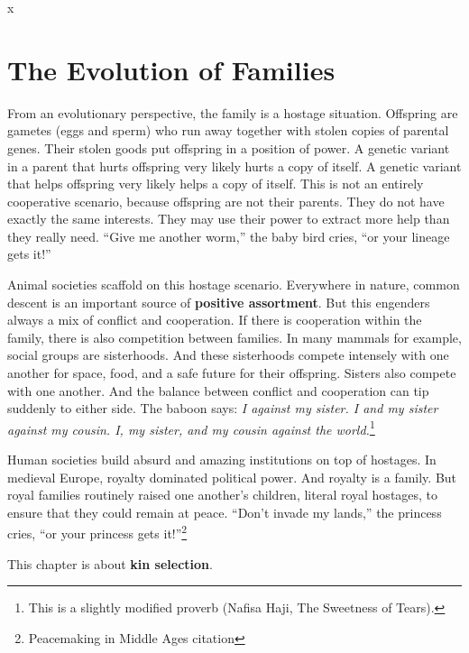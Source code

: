 \documentclass[10pt,reqno]{amsbook}
\newcommand{\bemph}[1]{{\textbf{\textcolor{bemphcol}{#1}}}}
\numberwithin{equation}{chapter}
\begin{document}
x

\def \chapterElement {K}
\chapter{The Evolution of Families}


From an evolutionary perspective, the family is a hostage situation. Offspring are gametes (eggs and sperm) who run away together with stolen copies of parental genes. Their stolen goods put offspring in a position of power. A genetic variant in a parent that hurts offspring very likely hurts a copy of itself. A genetic variant that helps offspring very likely helps a copy of itself. This is not an entirely cooperative scenario, because offspring are not their parents. They do not have exactly the same interests. They may use their power to extract more help than they really need. ``Give me another worm,'' the baby bird cries, ``or your lineage gets it!''

Animal societies scaffold on this hostage scenario. Everywhere in nature, common descent is an important source of \bemph{positive assortment}. But this engenders always a mix of conflict and cooperation. If there is cooperation within the family, there is also competition between families. In many mammals for example, social groups are sisterhoods. And these sisterhoods compete intensely with one another for space, food, and a safe future for their offspring. Sisters also compete with one another. And the balance between conflict and cooperation can tip suddenly to either side. The baboon says: \emph{I against my sister. I and my sister against my cousin. I, my sister, and my cousin against the world.}\footnote{This is a slightly modified proverb (Nafisa Haji, The Sweetness of Tears).}

Human societies build absurd and amazing institutions on top of hostages. In medieval Europe, royalty dominated political power. And royalty is a family. But royal families routinely raised one another's children, literal royal hostages, to ensure that they could remain at peace. ``Don't invade my lands,'' the princess cries, ``or your princess gets it!''\footnote{Peacemaking in Middle Ages citation}  %

This chapter is about \bemph{kin selection}. 
\end{document}

